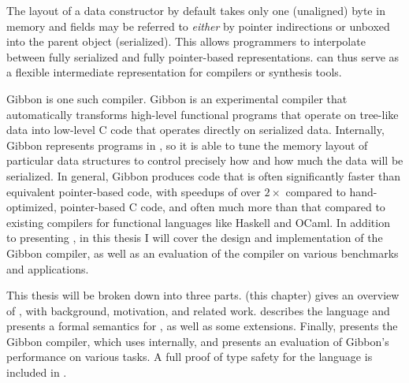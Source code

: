 
The layout of a \ourcalc{} data constructor by default takes only one (unaligned)
byte in memory and fields may be referred to \emph{either} by pointer
indirections or unboxed into the parent object (serialized). This allows
programmers to interpolate between fully serialized and fully pointer-based
representations.
%
\ourcalc{} can thus serve as a flexible intermediate representation for compilers
or synthesis tools.

Gibbon is one such compiler. Gibbon is an experimental compiler that
automatically transforms high-level functional programs that operate on
tree-like data into low-level C code that operates directly on serialized data.
Internally, Gibbon represents programs in \ourcalc, so it is able to tune the
memory layout of particular data structures to control precisely how and how
much the data will be serialized. In general, Gibbon produces code that is often
significantly faster than equivalent pointer-based code, with speedups of over
$2\times$ compared to hand-optimized, pointer-based C code, and often much more
than that compared to existing compilers for functional languages like Haskell
and OCaml. In addition to presenting \ourcalc, in this thesis I will cover
the design and implementation of the Gibbon compiler, as well as an evaluation
of the compiler on various benchmarks and applications.


This thesis will be broken down into three parts.  (this
chapter) gives an overview of \ourcalc, with background, motivation, and related
work.  describes the language and presents a formal
semantics for \ourcalc, as well as some extensions. Finally,
 presents the Gibbon compiler, which uses \ourcalc{}
internally, and presents an evaluation of Gibbon's performance on various tasks.
A full proof of type safety for the \ourcalc{} language is included in .



